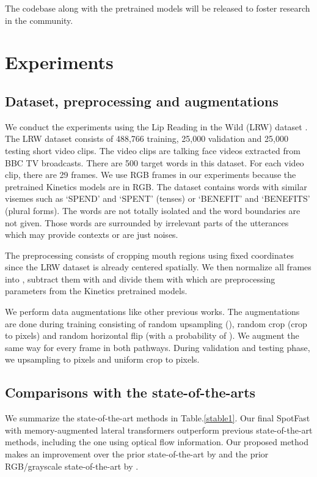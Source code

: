\documentclass{article}
\begin{document}
The codebase along with the pretrained models will be released to foster research in the community. 
 \section{Experiments}
\subsection{Dataset, preprocessing and augmentations}
We conduct the experiments using the Lip Reading in the Wild (LRW) dataset \cite{chung2016lip}. The LRW dataset consists of 488,766 training, 25,000 validation and 25,000 testing short video clips. The video clips are talking face videos extracted from BBC TV broadcasts. There are 500 target words in this dataset. For each video clip, there are 29 frames. We use RGB frames in our experiments because the pretrained Kinetics models are in RGB. The dataset contains words with similar visemes such as `SPEND' and `SPENT' (tenses) or `BENEFIT' and `BENEFITS' (plural forms). The words are not totally isolated and the word boundaries are not given. Those words are surrounded by irrelevant parts of the utterances which may provide contexts or are just noises.  

The preprocessing consists of cropping mouth regions using fixed coordinates since the LRW dataset is already centered spatially. We then normalize all frames into , subtract them with  and divide them with  which are preprocessing parameters from the Kinetics pretrained models.

We perform data augmentations like other previous works. The augmentations are done during training consisting of random upsampling (), random crop (crop to  pixels) and random horizontal flip (with a probability of ). We augment the same way for every frame in both pathways. During validation and testing phase, we upsampling to  pixels and uniform crop to  pixels.

\subsection{Comparisons with the state-of-the-arts}
We summarize the state-of-the-art methods in Table.\ref{stable1}. Our final SpotFast with memory-augmented lateral transformers outperform previous state-of-the-art methods, including the one using optical flow information. Our proposed method makes an improvement over the prior state-of-the-art \cite{weng2019learning} by  and the prior RGB/grayscale state-of-the-art \cite{Zhang_2019_ICCV} by .
\end{document}
